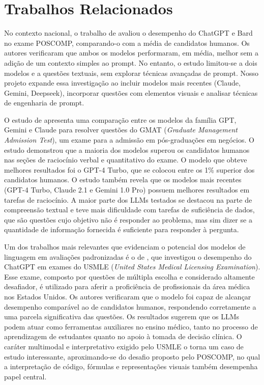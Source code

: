 \documentclass[brazilian, spanish, english]{RBIEarticle}
\begin{document}
\section{Trabalhos Relacionados}


No contexto nacional, o trabalho de \parencite{sbsi} avaliou o desempenho do ChatGPT e Bard no exame POSCOMP, comparando-o com a média de candidatos humanos. Os autores verificaram que ambos os modelos performaram, em média, melhor sem a adição de um contexto simples ao prompt. No entanto, o estudo limitou-se a dois modelos e a questões textuais, sem explorar técnicas avançadas de prompt. Nosso projeto expande essa investigação ao incluir modelos mais recentes (Claude, Gemini, Deepseek), incorporar questões com elementos visuais e analisar técnicas de engenharia de prompt.


O estudo de \parencite{ashrafimoghari2024evaluatinglargelanguagemodels} apresenta uma comparação entre os modelos da família GPT, Gemini e Claude para resolver questões do GMAT (\textit{Graduate Management Admission Test}), um exame para a admissão em pós-graduações em negócios. O estudo demonstrou que a maioria dos modelos superou os candidatos humanos nas seções de raciocínio verbal e quantitativo do exame. O modelo que obteve melhores resultados foi o GPT-4 Turbo, que se colocou entre os 1\% superior dos candidatos humanos. O estudo também revela que os modelos mais recentes (GPT-4 Turbo, Claude 2.1 e Gemini 1.0 Pro) possuem melhores resultados em tarefas de raciocínio. A maior parte dos LLMs testados se destacou na parte de compreensão textual e teve mais dificuldade com tarefas de suficiência de dados, que são questões cujo objetivo não é responder ao problema, mas sim dizer se a quantidade de informação fornecida é suficiente para responder à pergunta.


Um dos trabalhos mais relevantes que evidenciam o potencial dos modelos de linguagem em avaliações padronizadas é o de \parencite{kung2023performance}, que investigou o desempenho do ChatGPT em exames do USMLE (\textit{United States Medical Licensing Examination}). Esse exame, composto por questões de múltipla escolha e considerado altamente desafiador, é utilizado para aferir a proficiência de profissionais da área médica nos Estados Unidos. Os autores verificaram que o modelo foi capaz de alcançar desempenho comparável ao de candidatos humanos, respondendo corretamente a uma parcela significativa das questões. Os resultados sugerem que os LLMs podem atuar como ferramentas auxiliares no ensino médico, tanto no processo de aprendizagem de estudantes quanto no apoio à tomada de decisão clínica. O caráter multimodal e interpretativo exigido pelo USMLE o torna um caso de estudo interessante, aproximando-se do desafio proposto pelo POSCOMP, no qual a interpretação de código, fórmulas e representações visuais também desempenha papel central.
\end{document}
